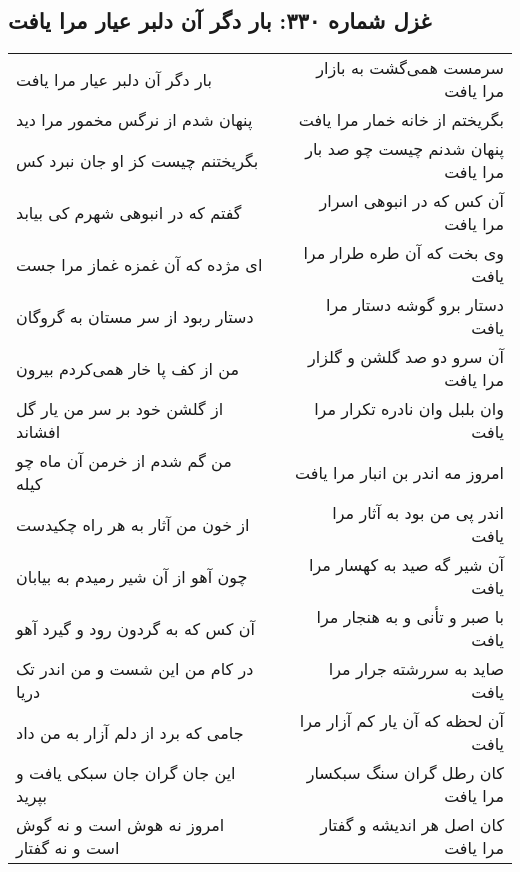 \begin{center}
\section*{غزل شماره ۳۳۰: بار دگر آن دلبر عیار مرا یافت}
\label{sec:0330}
\begin{longtable}{l p{0.5cm} r}
بار دگر آن دلبر عیار مرا یافت
&&
سرمست همی‌گشت به بازار مرا یافت
\\
پنهان شدم از نرگس مخمور مرا دید
&&
بگریختم از خانه خمار مرا یافت
\\
بگریختنم چیست کز او جان نبرد کس
&&
پنهان شدنم چیست چو صد بار مرا یافت
\\
گفتم که در انبوهی شهرم کی بیابد
&&
آن کس که در انبوهی اسرار مرا یافت
\\
ای مژده که آن غمزه غماز مرا جست
&&
وی بخت که آن طره طرار مرا یافت
\\
دستار ربود از سر مستان به گروگان
&&
دستار برو گوشه دستار مرا یافت
\\
من از کف پا خار همی‌کردم بیرون
&&
آن سرو دو صد گلشن و گلزار مرا یافت
\\
از گلشن خود بر سر من یار گل افشاند
&&
وان بلبل وان نادره تکرار مرا یافت
\\
من گم شدم از خرمن آن ماه چو کیله
&&
امروز مه اندر بن انبار مرا یافت
\\
از خون من آثار به هر راه چکیدست
&&
اندر پی من بود به آثار مرا یافت
\\
چون آهو از آن شیر رمیدم به بیابان
&&
آن شیر گه صید به کهسار مرا یافت
\\
آن کس که به گردون رود و گیرد آهو
&&
با صبر و تأنی و به هنجار مرا یافت
\\
در کام من این شست و من اندر تک دریا
&&
صاید به سررشته جرار مرا یافت
\\
جامی که برد از دلم آزار به من داد
&&
آن لحظه که آن یار کم آزار مرا یافت
\\
این جان گران جان سبکی یافت و بپرید
&&
کان رطل گران سنگ سبکسار مرا یافت
\\
امروز نه هوش است و نه گوش است و نه گفتار
&&
کان اصل هر اندیشه و گفتار مرا یافت
\\
\end{longtable}
\end{center}
